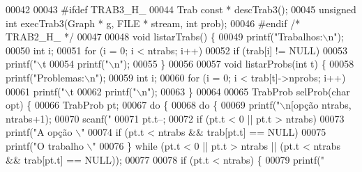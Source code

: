 \begin{DoxyCode}
00042 
00043 \textcolor{preprocessor}{#ifdef TRAB3\_H\_}
00044 Trab \textcolor{keyword}{const} * descTrab3();
00045 \textcolor{keywordtype}{unsigned} \textcolor{keywordtype}{int} execTrab3(Graph * g, FILE * stream, \textcolor{keywordtype}{int} prob);
00046 \textcolor{preprocessor}{#endif }\textcolor{comment}{/* TRAB2\_H\_ */}\textcolor{preprocessor}{}
00047 
00048 \textcolor{keywordtype}{void} listarTrabs() \{
00049         printf(\textcolor{stringliteral}{"Trabalhos:\(\backslash\)n"});
00050         \textcolor{keywordtype}{int} i;
00051         \textcolor{keywordflow}{for} (i = 0; i < ntrabs; i++)
00052                 \textcolor{keywordflow}{if} (trab[i] != NULL)
00053                         printf(\textcolor{stringliteral}{"\(\backslash\)t%
00054         printf(\textcolor{stringliteral}{"\(\backslash\)n"});
00055 \}
00056 
00057 \textcolor{keywordtype}{void} listarProbs(\textcolor{keywordtype}{int} t) \{
00058         printf(\textcolor{stringliteral}{"Problemas:\(\backslash\)n"});
00059         \textcolor{keywordtype}{int} i;
00060         \textcolor{keywordflow}{for} (i = 0; i < trab[t]->nprobs; i++)
00061                 printf(\textcolor{stringliteral}{"\(\backslash\)t%
00062         printf(\textcolor{stringliteral}{"\(\backslash\)n"});
00063 \}
00064 
00065 TrabProb selProb(\textcolor{keywordtype}{char} opt) \{
00066         TrabProb pt;
00067         \textcolor{keywordflow}{do} \{
00068                 \textcolor{keywordflow}{do} \{
00069                         printf(\textcolor{stringliteral}{"\(\backslash\)n[opção %
      ntrabs, ntrabs+1);
00070                         scanf(\textcolor{stringliteral}{"%
00071                         pt.t--;
00072                         \textcolor{keywordflow}{if} (pt.t < 0 || pt.t > ntrabs)
00073                                 printf(\textcolor{stringliteral}{"A opção \(\backslash\)"%
00074                         \textcolor{keywordflow}{if} (pt.t < ntrabs && trab[pt.t] == NULL)
00075                                 printf(\textcolor{stringliteral}{"O trabalho \(\backslash\)"%
00076                 \} \textcolor{keywordflow}{while} (pt.t < 0 || pt.t > ntrabs || (pt.t < ntrabs && trab[pt.t] == NULL));
00077 
00078                 \textcolor{keywordflow}{if} (pt.t < ntrabs) \{
00079                         printf(\textcolor{stringliteral}{"%
}}}}}}}
\end{DoxyCode}
